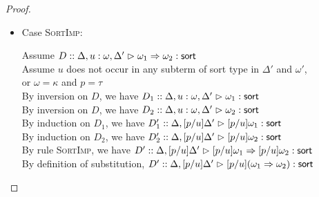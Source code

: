 \begin{proof}
\begin{enumerate}
\begin{itemize}
  \item Case \textsc{SortImp}: 
    \begin{tabbedproof}
      \oo Assume $D :: \judgeSort[\Delta, u:\omega, \Delta']{\omega_1 \To \omega_2}$ \\
      \oo Assume $u$ does not occur in any subterm of sort type in $\Delta'$ and $\omega'$, \\
      \ox or $\omega = \kappa$ and $p = \tau$\\
      \ooo By inversion on $D$, we have 
             $D_1 :: \judgeSort[\Delta, u:\omega, \Delta']{\omega_1}$ \\
      \ooo By inversion on $D$, we have 
             $D_2 :: \judgeSort[\Delta, u:\omega, \Delta']{\omega_2}$ \\
      \ooo By induction on $D_1$, we have 
             $D'_1 :: \judgeSort[{\Delta, [p/u]\Delta'}]{[p/u]\omega_1}$ \\
      \ooo By induction on $D_2$, we have 
             $D'_2 :: \judgeSort[{\Delta, [p/u]\Delta'}]{[p/u]\omega_2}$ \\
      \ooo By rule \textsc{SortImp}, we have 
            $D' :: \judgeSort[{\Delta, [p/u]\Delta'}]{[p/u]\omega_1 \To [p/u]\omega_2}$ \\
      \ooo By definition of substitution, 
            $D' :: \judgeSort[{\Delta, [p/u]\Delta'}]{[p/u](\omega_1 \To \omega_2)}$ \\
    \end{tabbedproof}


\end{itemize}
\end{enumerate}
\end{proof}
